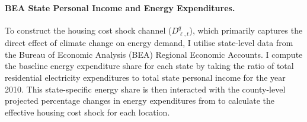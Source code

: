 \paragraph{BEA State Personal Income and Energy Expenditures.} To construct the housing cost shock channel ($D^q_{\ell, t}$), which primarily captures the direct effect of climate change on energy demand, I utilise state-level data from the Bureau of Economic Analysis (BEA) Regional Economic Accounts. I compute the baseline energy expenditure share for each state by taking the ratio of total residential electricity expenditures to total state personal income for the year 2010. This state-specific energy share is then interacted with the county-level projected percentage changes in energy expenditures from \citet{hsiang_estimating_2017} to calculate the effective housing cost shock for each location.